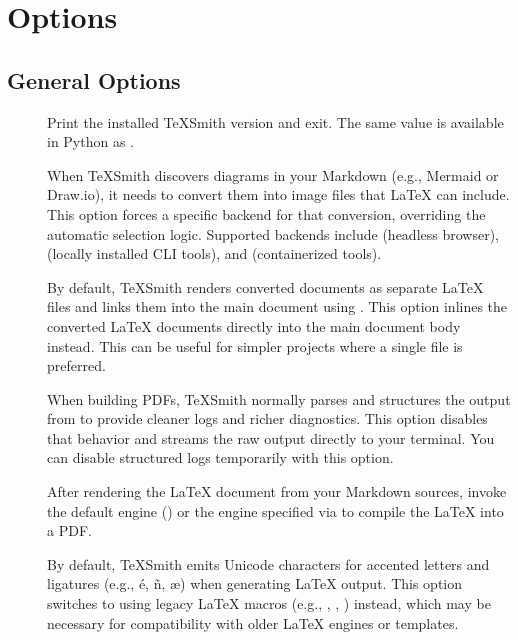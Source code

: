 \documentclass[a4paper,twoside]{article}
\begin{document}
\section{Options}
\subsection{General Options}
\begin{description}
\item[{}] Print the installed TeXSmith version and exit. The same value is available in Python as .
\item[{}] When TeXSmith discovers diagrams in your Markdown (e.g., Mermaid or Draw.io), it needs to convert them into image files that \LaTeX{} can include. This option forces a specific backend for that conversion, overriding the automatic selection logic. Supported backends include  (headless browser),  (locally installed CLI tools), and  (containerized tools).
\item[{}] By default, TeXSmith renders converted documents as separate \LaTeX{} files and links them into the main document using . This option inlines the converted \LaTeX{} documents directly into the main document body instead. This can be useful for simpler projects where a single  file is preferred.
\item[{}] When building PDFs, TeXSmith normally parses and structures the output from  to provide cleaner logs and richer diagnostics. This option disables that behavior and streams the raw  output directly to your terminal. You can disable structured logs temporarily with this option.
\item[{}] After rendering the \LaTeX{} document from your Markdown sources, invoke the default engine () or the engine specified via  to compile the \LaTeX{} into a PDF.
\item[{}] By default, TeXSmith emits Unicode characters for accented letters and ligatures (e.g., é, ñ, æ) when generating \LaTeX{} output. This option switches to using legacy \LaTeX{} macros (e.g., , , ) instead, which may be necessary for compatibility with older \LaTeX{} engines or templates.

\end{description}
\end{document}
